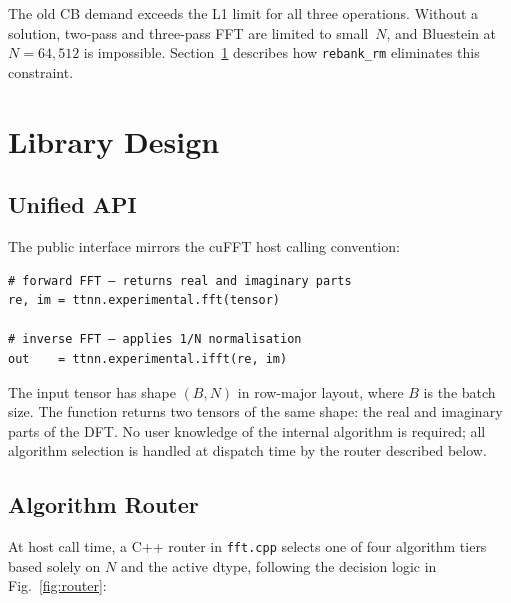 \documentclass[conference]{IEEEtran}
\begin{document}
The old CB demand exceeds the L1 limit for all three operations. Without
a solution, two-pass and three-pass FFT are limited to small~$N$, and Bluestein
at $N = 64{,}512$ is impossible. Section~\ref{sec:design} describes how
\texttt{rebank\_rm} eliminates this constraint.

\section{Library Design}
\label{sec:design}

\subsection{Unified API}

The public interface mirrors the cuFFT host calling convention:

\begin{lstlisting}
# forward FFT — returns real and imaginary parts
re, im = ttnn.experimental.fft(tensor)

# inverse FFT — applies 1/N normalisation
out    = ttnn.experimental.ifft(re, im)
\end{lstlisting}

The input tensor has shape $(B, N)$ in row-major layout, where $B$ is the batch
size. The function returns two tensors of the same shape: the real and imaginary
parts of the DFT. No user knowledge of the internal algorithm is required; all
algorithm selection is handled at dispatch time by the router described below.

\subsection{Algorithm Router}

At host call time, a C++ router in \texttt{fft.cpp} selects one of four
algorithm tiers based solely on $N$ and the active dtype, following the decision
logic in Fig.~\ref{fig:router}:
\end{document}
